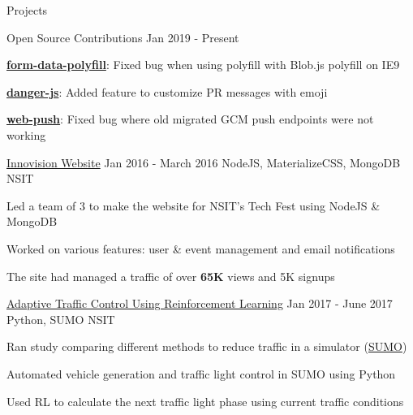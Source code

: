 \documentclass{resume} %
\begin{document}

\begin{rSection}{Projects}

    \begin{rSubsection}
        {Open Source Contributions}
            {Jan 2019 - Present}
        {}{}

        \item \href{https://github.com/jimmywarting/FormData/pull/87}{\textbf{form-data-polyfill}}: Fixed bug when using polyfill with Blob.js polyfill on IE9
        \item \href{https://github.com/danger/danger-js/pull/892}{\textbf{danger-js}}: Added feature to customize PR messages with emoji \faHeart
        \item \href{https://github.com/web-push-libs/web-push/pull/456}{\textbf{web-push}}: Fixed bug where old migrated GCM push endpoints were not working
    \end{rSubsection}

    \begin{rSubsection}
        {\href{https://github.com/rohit-smpx/inno}{Innovision Website}}
            {Jan 2016 - March 2016}
        {NodeJS, MaterializeCSS, MongoDB}
            {NSIT}

        \item Led a team of 3 to make the website for NSIT’s Tech Fest using NodeJS \& MongoDB
        \item Worked on various features: user \& event management and email notifications
        \item The site had managed a traffic of over \textbf{65K} views and 5K signups
    \end{rSubsection}    

    \begin{rSubsection}
        {\href{https://github.com/rohit-smpx/trafficRL}{Adaptive Traffic Control Using Reinforcement Learning}}
            {Jan 2017 - June 2017}
        {Python, SUMO}
            {NSIT}

        \item Ran study comparing different methods to reduce traffic in a simulator (\href{https://sumo.dlr.de}{SUMO})
        \item Automated vehicle generation and traffic light control in SUMO using Python
        \item Used RL to calculate the next traffic light phase using current traffic conditions
    \end{rSubsection}
    

\end{rSection}
\end{document}
